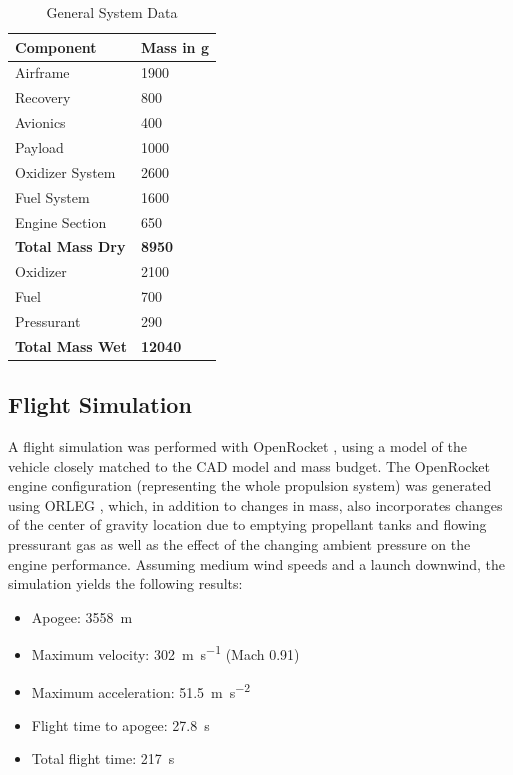 \begin{table}[]
\centering
\begin{tabular}{|l|l|}
\hline
\textbf{Component} & \multicolumn{1}{c|}{\textbf{Mass in g}} \\ \hline
Airframe & 1900 \\ \hline
Recovery & 800 \\ \hline
Avionics & 400 \\ \hline
Payload & 1000 \\ \hline
Oxidizer System & 2600 \\ \hline
Fuel System & 1600 \\ \hline
Engine Section & 650 \\ \hline
\textbf{Total Mass Dry} & \textbf{8950} \\ \hline
Oxidizer & 2100 \\ \hline
Fuel & 700 \\ \hline
Pressurant & 290 \\ \hline
\textbf{Total Mass Wet} & \textbf{12040} \\ \hline
\end{tabular}
\caption{General System Data}
\label{tab:massbudget}
\end{table}

\subsection{Flight Simulation}

A flight simulation was performed with OpenRocket \cite{openrocket}, using a model of the vehicle closely matched to the CAD model and mass budget. The OpenRocket engine configuration (representing the whole propulsion system) was generated using ORLEG \cite{orleg}, which, in addition to changes in mass, also incorporates changes of the center of gravity location due to emptying propellant tanks and flowing pressurant gas as well as the effect of the changing ambient pressure on the engine performance. Assuming medium wind speeds and a launch downwind, the simulation yields the following results:

\begin{itemize}
\item Apogee: \SI{3558}{\meter}
\item Maximum velocity: \SI{302}{\meter\per\second} (Mach 0.91)
\item Maximum acceleration: \SI{51.5}{\meter\per\second\squared}
\item Flight time to apogee: \SI{27.8}{\second}
\item Total flight time: \SI{217}{\second}
\end{itemize}

